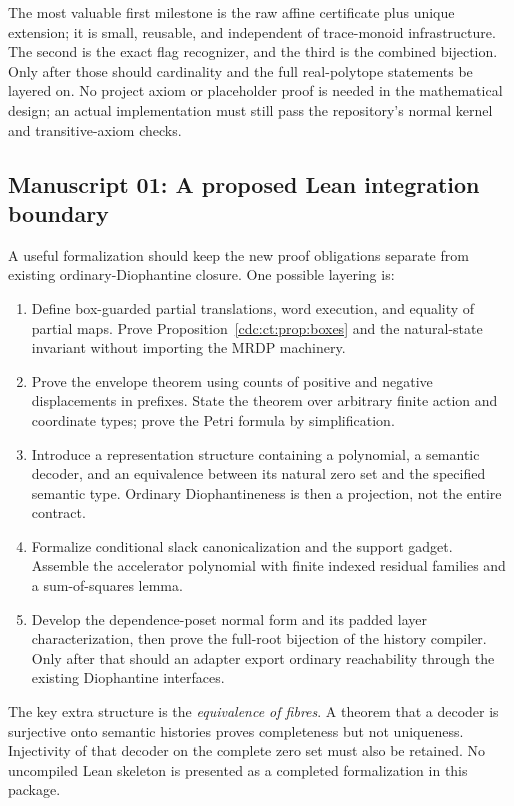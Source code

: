\documentclass[11pt,a4paper]{article}
\theoremstyle{definition}
\theoremstyle{remark}
\begin{document}
The most valuable first milestone is the raw affine certificate plus unique extension; it is small, reusable, and independent of trace-monoid infrastructure. The second is the exact flag recognizer, and the third is the combined bijection. Only after those should cardinality and the full real-polytope statements be layered on. No project axiom or placeholder proof is needed in the mathematical design; an actual implementation must still pass the repository's normal kernel and transitive-axiom checks.


\subsection{Manuscript 01: A proposed Lean integration boundary}
A useful formalization should keep the new proof obligations separate from existing ordinary-Diophantine closure. One possible layering is:
\begin{enumerate}[label=\arabic*.]
\item Define box-guarded partial translations, word execution, and equality of partial maps. Prove Proposition~\ref{cdc:ct:prop:boxes} and the natural-state invariant without importing the MRDP machinery.
\item Prove the envelope theorem using counts of positive and negative displacements in prefixes. State the theorem over arbitrary finite action and coordinate types; prove the Petri formula by simplification.
\item Introduce a representation structure containing a polynomial, a semantic decoder, and an equivalence between its natural zero set and the specified semantic type. Ordinary Diophantineness is then a projection, not the entire contract.
\item Formalize conditional slack canonicalization and the support gadget. Assemble the accelerator polynomial with finite indexed residual families and a sum-of-squares lemma.
\item Develop the dependence-poset normal form and its padded layer characterization, then prove the full-root bijection of the history compiler. Only after that should an adapter export ordinary reachability through the existing Diophantine interfaces.
\end{enumerate}
The key extra structure is the \emph{equivalence of fibres}. A theorem that a decoder is surjective onto semantic histories proves completeness but not uniqueness. Injectivity of that decoder on the complete zero set must also be retained. No uncompiled Lean skeleton is presented as a completed formalization in this package.
\end{document}
